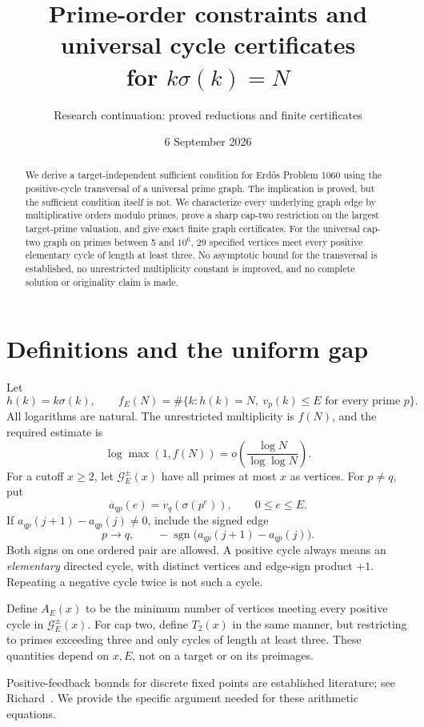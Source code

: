 \documentclass[11pt]{article}
\title{Prime-order constraints and universal cycle certificates\\for \texorpdfstring{$k\sigma(k)=N$}{k sigma(k)=N}}
\author{Research continuation: proved reductions and finite certificates}
\date{6 September 2026}
\DeclareMathOperator{\sgn}{sgn}
\begin{document}
\maketitle
\begin{abstract}
We derive a target-independent sufficient condition for Erd\H{o}s Problem 1060 using the positive-cycle transversal of a universal prime graph. The implication is proved, but the sufficient condition itself is not. We characterize every underlying graph edge by multiplicative orders modulo primes, prove a sharp cap-two restriction on the largest target-prime valuation, and give exact finite graph certificates. For the universal cap-two graph on primes between 5 and $10^6$, 29 specified vertices meet every positive elementary cycle of length at least three. No asymptotic bound for the transversal is established, no unrestricted multiplicity constant is improved, and no complete solution or originality claim is made.
\end{abstract}

\section{Definitions and the uniform gap}
Let
\[
 h(k)=k\sigma(k),\qquad f_E(N)=\#\{k:h(k)=N,\ v_p(k)\le E\text{ for every prime }p\}.
\]
All logarithms are natural. The unrestricted multiplicity is $f(N)$, and the required estimate is
\[
 \log\max(1,f(N))=o\!\left(\frac{\log N}{\log\log N}\right).
\]
For a cutoff $x\ge2$, let $\mathcal G_E^{\pm}(x)$ have all primes at most $x$ as vertices. For $p\ne q$, put
\[
 a_{qp}(e)=v_q(\sigma(p^e)),\qquad 0\le e\le E.
\]
If $a_{qp}(j+1)-a_{qp}(j)\ne0$, include the signed edge
\[
 p\longrightarrow q,\qquad -\sgn\bigl(a_{qp}(j+1)-a_{qp}(j)\bigr).
\]
Both signs on one ordered pair are allowed. A positive cycle always means an \emph{elementary} directed cycle, with distinct vertices and edge-sign product $+1$. Repeating a negative cycle twice is not such a cycle.

Define $A_E(x)$ to be the minimum number of vertices meeting every positive cycle in $\mathcal G_E^{\pm}(x)$. For cap two, define $T_2(x)$ in the same manner, but restricting to primes exceeding three and only cycles of length at least three. These quantities depend on $x,E$, not on a target or on its preimages.

Positive-feedback bounds for discrete fixed points are established literature; see Richard~\cite{richard}. We provide the specific argument needed for these arithmetic equations.
\end{document}
